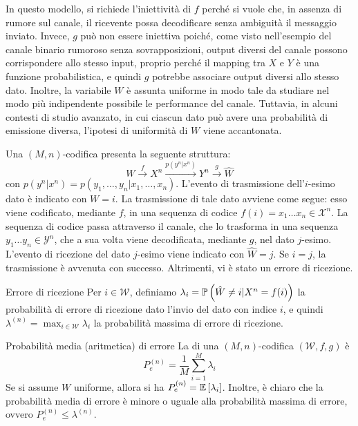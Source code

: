 \begin{note}{}
  In questo modello, si richiede l'iniettività di $f$ perché si vuole che, in assenza di rumore sul canale, il ricevente possa decodificare senza ambiguità il messaggio inviato. 
  Invece, $g$ può non essere iniettiva poiché, come visto nell'esempio del canale binario rumoroso senza sovrapposizioni, output diversi del canale possono corrispondere allo stesso input, proprio perché il mapping tra $X$ e $Y$ è una funzione probabilistica, e quindi $g$ potrebbe associare output diversi allo stesso dato. 
  Inoltre, la variabile $W$ è assunta uniforme in modo tale da studiare nel modo più indipendente possibile le performance del canale. Tuttavia, in alcuni contesti di studio avanzato, in cui ciascun dato può avere una probabilità di emissione diversa, l'ipotesi di uniformità di $W$ viene accantonata.
\end{note}

Una \((M,n)\)-codifica presenta la seguente struttura:
\[W \xrightarrow{f} X^n \xrightarrow{p(y^n|x^n)} Y^n \xrightarrow{g} \hat{W}\]
con \(p(y^n|x^n) = p(y_1,\ldots,y_n|x_1,\ldots,x_n)\).
L'evento di trasmissione dell'$i$-esimo dato è indicato con $W=i$. 
La trasmissione di tale dato avviene come segue: esso viene codificato, mediante $f$, in una sequenza di codice $f(i)=x_1\ldots x_n \in \mathcal{X}^{n}$. 
La sequenza di codice passa attraverso il canale, che lo trasforma in una sequenza $y_1\ldots y_n \in \mathcal{Y}^{n}$, che a sua volta viene decodificata, mediante $g$, nel dato $j$-esimo. 
L'evento di ricezione del dato $j$-esimo viene indicato con $\hat{W}=j$.
Se $i=j$, la trasmissione è avvenuta con successo. Altrimenti, vi è stato un errore di ricezione. 

\begin{definition}{Errore di ricezione}
  Per \(i \in \mathcal{W}\), definiamo \(\lambda_i = \Prob[\hat{W}\neq i|X^n = f(i)]\) la probabilità di errore di ricezione dato l'invio del dato con indice $i$, e quindi \(\lambda^{(n)} = \max_{i\in\mathcal{W}} \lambda_i\) la probabilità massima di errore di ricezione.
\end{definition}

\begin{definition}{Probabilità media (aritmetica) di errore}
  La  di una \((M,n)\)-codifica \((\mathcal{W},f,g)\) è
  \[P_e^{(n)} = \frac{1}{M} \sum_{i=1}^M \lambda_i\]
  Se si assume $W$ uniforme, allora si ha $P_e^{(n)}=\EV{\lambda_i}$.
  Inoltre, è chiaro che la probabilità media di errore è minore o uguale alla probabilità massima di errore, ovvero \(P_e^{(n)} \leq \lambda^{(n)}\).
\end{definition}

